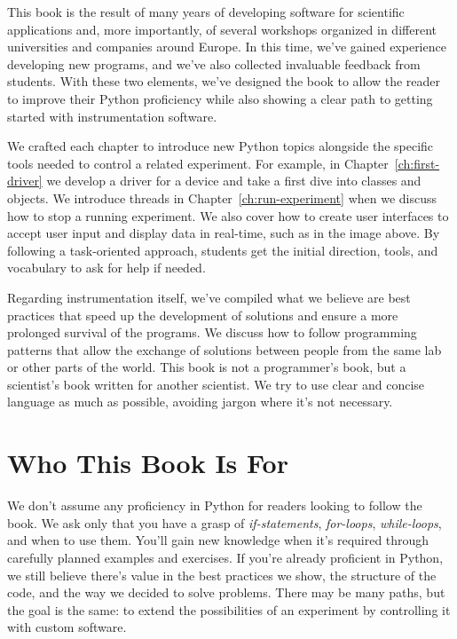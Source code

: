 This book is the result of many years of developing software for scientific applications and, more importantly, of several workshops organized in different universities and companies around Europe. In this time, we've gained experience developing new programs, and we've also collected invaluable feedback from students. With these two elements, we've designed the book to allow the reader to improve their Python proficiency while also showing a clear path to getting started with instrumentation software.

We crafted each chapter to introduce new Python topics alongside the specific tools needed to control a related experiment. For example, in Chapter~\ref{ch:first-driver} we develop a driver for a device and take a first dive into classes and objects. We introduce threads in Chapter~\ref{ch:run-experiment} when we discuss how to stop a running experiment. We also cover how to create user interfaces to accept user input and display data in real-time, such as in the image above. By following a task-oriented approach, students get the initial direction, tools, and vocabulary to ask for help if needed.

Regarding instrumentation itself, we've compiled what we believe are best practices that speed up the development of solutions and ensure a more prolonged survival of the programs. We discuss how to follow programming patterns that allow the exchange of solutions between people from the same lab or other parts of the world. This book is not a programmer's book, but a scientist's book written for another scientist. We try to use clear and concise language as much as possible, avoiding jargon where it's not necessary.

\section{Who This Book Is For}\label{sec:who-can-read-this-book}
We don't assume any proficiency in Python for readers looking to follow the book. We ask only that you have a grasp of \textit{if-statements}, \textit{for-loops}, \textit{while-loops}, and when to use them. You'll gain new knowledge when it's required through carefully planned examples and exercises. If you're already proficient in Python, we still believe there's value in the best practices we show, the structure of the code, and the way we decided to solve problems. There may be many paths, but the goal is the same: to extend the possibilities of an experiment by controlling it with custom software.

